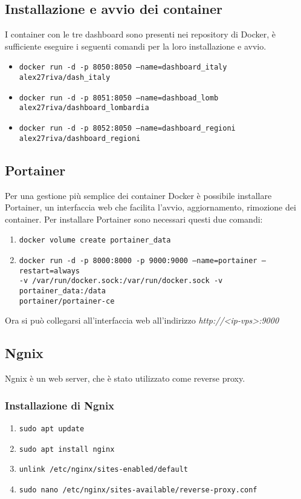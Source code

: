 \subsection{Installazione e avvio dei container}
I container con le tre dashboard sono presenti nei repository di Docker, è sufficiente eseguire i seguenti comandi per la loro installazione e avvio.
\begin{itemize}
\item \texttt{docker run -d -p 8050:8050 --name=dashboard\_italy alex27riva/dash\_italy}
\item \texttt{docker run -d -p 8051:8050 --name=dashboad\_lomb alex27riva/dashboard\_lombardia}
\item \texttt{docker run -d -p 8052:8050 --name=dashboard\_regioni alex27riva/dashboard\_regioni}
\end{itemize}

\subsection{Portainer}
Per una gestione più semplice dei container Docker è possibile installare Portainer, un interfaccia web che facilita l'avvio, aggiornamento, rimozione dei container.
Per installare Portainer sono necessari questi due comandi:
\begin{enumerate}
    \item \texttt{docker volume create portainer\_data}
    \item \texttt{docker run -d -p 8000:8000 -p 9000:9000 --name=portainer --restart=always\\ -v /var/run/docker.sock:/var/run/docker.sock -v portainer\_data:/data\\ portainer/portainer-ce}
\end{enumerate}

Ora si può collegarsi all'interfaccia web all'indirizzo \emph{http://\textless ip-vps\textgreater:9000}

\subsection{Ngnix}
Ngnix è un web server, che è stato utilizzato come reverse proxy.

\subsubsection{Installazione di Ngnix}

\begin{enumerate}
    \item \texttt{sudo apt update}
    \item \texttt{sudo apt install nginx}
    \item \texttt{unlink /etc/nginx/sites-enabled/default}
    \item \texttt{sudo nano /etc/nginx/sites-available/reverse-proxy.conf}
\end{enumerate}

